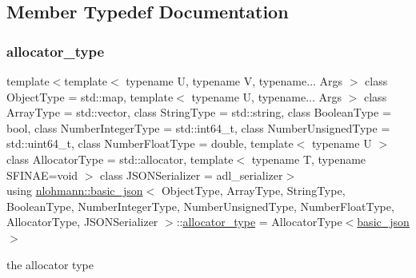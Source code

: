 \subsection{Member Typedef Documentation}
\mbox{\label{classnlohmann_1_1basic__json_a86ce930490cf7773b26f5ef49c04a350}} 
\subsubsection{\texorpdfstring{allocator\_type}{allocator\_type}}
{\footnotesize\ttfamily template$<$template$<$ typename U, typename V, typename... Args $>$ class Object\+Type = std\+::map, template$<$ typename U, typename... Args $>$ class Array\+Type = std\+::vector, class String\+Type  = std\+::string, class Boolean\+Type  = bool, class Number\+Integer\+Type  = std\+::int64\+\_\+t, class Number\+Unsigned\+Type  = std\+::uint64\+\_\+t, class Number\+Float\+Type  = double, template$<$ typename U $>$ class Allocator\+Type = std\+::allocator, template$<$ typename T, typename S\+F\+I\+N\+A\+E=void $>$ class J\+S\+O\+N\+Serializer = adl\+\_\+serializer$>$ \\
using \mbox{\hyperlink{classnlohmann_1_1basic__json}{nlohmann\+::basic\+\_\+json}}$<$ Object\+Type, Array\+Type, String\+Type, Boolean\+Type, Number\+Integer\+Type, Number\+Unsigned\+Type, Number\+Float\+Type, Allocator\+Type, J\+S\+O\+N\+Serializer $>$\+::\mbox{\hyperlink{classnlohmann_1_1basic__json_a86ce930490cf7773b26f5ef49c04a350}{allocator\+\_\+type}} =  Allocator\+Type$<$\mbox{\hyperlink{classnlohmann_1_1basic__json}{basic\+\_\+json}}$>$}



the allocator type 

